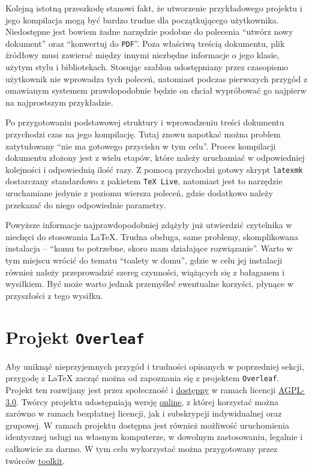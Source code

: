 Kolejną istotną przeszkodę stanowi fakt, że utworzenie przykładowego projektu i jego kompilacja mogą być bardzo trudne dla początkującego użytkownika. Niedostępne jest bowiem żadne narzędzie podobne do polecenia \enquote{utwórz nowy dokument} oraz \enquote{konwertuj do \texttt{PDF}}. Poza właściwą treścią dokumentu, plik źródłowy musi zawierać między innymi niezbędne informacje o jego klasie, użytym stylu i bibliotekach. Stosując szablon udostępniany przez czasopismo użytkownik nie wprowadza tych poleceń, natomiast podczas pierwszych przygód z omawianym systemem prawdopodobnie będzie on chciał wypróbować go najpierw na najprostszym przykładzie.

Po przygotowaniu podstawowej struktury i wprowadzeniu treści dokumentu przychodzi czas na jego kompilację. Tutaj znowu napotkać można problem zatytułowany \enquote{nie ma gotowego przycisku w tym celu}. Proces kompilacji dokumentu złożony jest z wielu etapów, które należy uruchamiać w odpowiedniej kolejności i odpowiednią ilość razy. Z pomocą przychodzi gotowy skrypt \texttt{latexmk} dostarczany standardowo z pakietem \texttt{TeX Live}, natomiast jest to narzędzie uruchamiane jedynie z poziomu wiersza poleceń, gdzie dodatkowo należy przekazać do niego odpowiednie parametry.

Powyższe informacje najprawdopodobniej zdążyły już utwierdzić czytelnika w niechęci do stosowania \LaTeX{}. Trudna obsługa, same problemy, skomplikowana instalacja -- \enquote{komu to potrzebne, skoro mam działające rozwiązanie}. Warto w tym miejscu wrócić do tematu \enquote{toalety w domu}, gdzie w celu jej instalacji również należy przeprowadzić szereg czynności, wiążących się z bałaganem i wysiłkiem. Być może warto jednak przemyśleć ewentualne korzyści, płynące w przyszłości z tego wysiłku.

\section{Projekt \texttt{Overleaf}}

Aby uniknąć nieprzyjemnych przygód i trudności opisanych w poprzedniej sekcji, przygodę z \LaTeX{} zacząć można od zapoznania się z projektem \texttt{Overleaf}. Projekt ten rozwijany jest przez społeczność i \href{https://github.com/overleaf/overleaf}{dostępny} w ramach licencji \href{https://www.gnu.org/licenses/agpl-3.0.html}{AGPL-3.0}. Twórcy projektu udostępniają wersję \href{https://www.overleaf.com}{online}, z której korzystać można zarówno w ramach bezpłatnej licencji, jak i subskrypcji indywidualnej oraz grupowej. W ramach projektu dostępna jest również możliwość uruchomienia identycznej usługi na własnym komputerze, w dowolnym zastosowaniu, legalnie i całkowicie za darmo. W tym celu wykorzystać można przygotowany przez twórców \href{https://github.com/overleaf/toolkit}{toolkit}.

